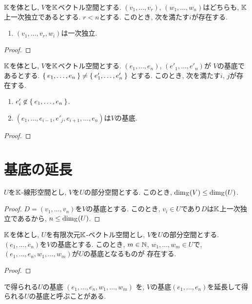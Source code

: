 \begin{prop}
$\mathbb{K}$を体とし,
  $V$を$\mathbb{K}$ベクトル空間とする.
  $(v_1,\ldots, v_r)$,
  $(w_1,\ldots, w_n)$はどちらも,
  $\mathbb{K}$上一次独立であるとする.  
$r<n$とする.
このとき, 次を満たす$i$が存在する.
\begin{enumerate}
\item $(v_1,\ldots,v_{r},w_{i})$は一次独立.
\end{enumerate}
\end{prop}
\begin{proof}\end{proof}

\begin{prop}
  $\mathbb{K}$を体とし,
  $V$を$\mathbb{K}$ベクトル空間とする.
  $(e_1,\ldots, e_n)$,
  $(e'_1,\ldots, e'_n)$が
  $V$の基底であるとする.
$\Set{e_1,\ldots, e_n}\neq \Set{e'_1,\ldots, e'_n}$
とする.
このとき, 次を満たす$i$, $j$が存在する.
\begin{enumerate}
\item $e'_i \not\in \Set{e_1,\ldots,e_n}$.
\item $(e_1,\ldots,e_{i-1},e'_{j},e_{i+1},\ldots,e_n)$は$V$の基底.
\end{enumerate}
\end{prop}
\begin{proof}\end{proof}


\section{基底の延長}
\label{sec:basis:ext}
\begin{prop}
  $U$を$\mathbb{K}$-線形空間とし,
  $V$を$U$の部分空間とする.
  このとき,  $\dim_{\mathbb{K}}(V) \leq \dim_{\mathbb{K}}(U)$.
\end{prop}
\begin{proof}
$D=(v_1,\ldots,v_n)$を$V$の基底とする.
このとき,
$v_i\in U$であり$D$は$\mathbb{K}$上一次独立であるから,
$n\leq \dim_{\mathbb{K}}(U)$.
\end{proof}


\begin{prop}
\label{prop:basis:ext}
  $\mathbb{K}$を体とし,
  $U$を有限次元$\mathbb{K}$-ベクトル空間とし,
  $V$を$U$の部分空間とする.
  $(e_1,\ldots,e_n)$を$V$の基底とする.
  このとき,
  $m\in \mathbb{N}$,
  $w_1,\ldots,w_m\in U$で,
  $(e_1,\ldots,e_n,w_1,\ldots,w_m)$が$U$の基底となるものが
  存在する.  
\end{prop}
\begin{proof}\end{proof}
\begin{remark}
で得られる$U$の基底
  $(e_1,\ldots,e_n,w_1,\ldots,w_m)$
  を,
  $V$の基底$(e_1,\ldots,e_n)$を延長して得られる$U$の基底と呼ぶことがある.
\end{remark}

